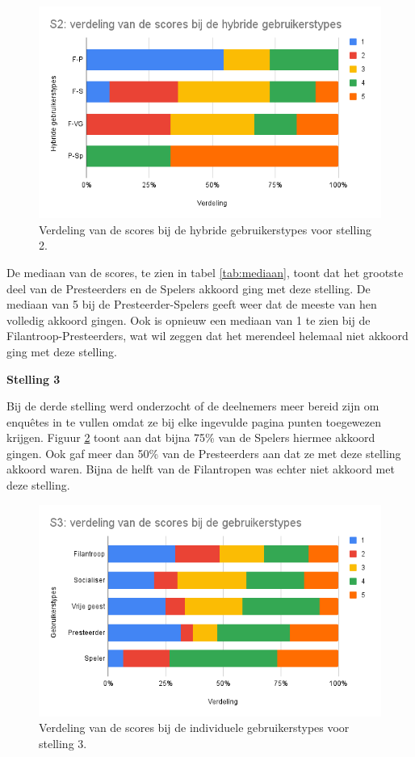 \begin{figure}
    \includegraphics[width=\linewidth]{S2_Hybride.png}
    \caption{Verdeling van de scores bij de hybride gebruikerstypes voor stelling 2.}
    \label{fig:s2_hybride}
\end{figure}

De mediaan van de scores, te zien in tabel \ref{tab:mediaan}, toont dat het grootste deel van de Presteerders en de Spelers akkoord ging met deze stelling. De mediaan van 5 bij de Presteerder-Spelers geeft weer dat de meeste van hen volledig akkoord gingen. Ook is opnieuw een mediaan van 1 te zien bij de Filantroop-Presteerders, wat wil zeggen dat het merendeel helemaal niet akkoord ging met deze stelling.

\textbf{Stelling 3}

Bij de derde stelling werd onderzocht of de deelnemers meer bereid zijn om enquêtes in te vullen omdat ze bij elke ingevulde pagina punten toegewezen krijgen. Figuur \ref{fig:s3} toont aan dat bijna 75\% van de Spelers hiermee akkoord gingen. Ook gaf meer dan 50\% van de Presteerders aan dat ze met deze stelling akkoord waren. Bijna de helft van de Filantropen was echter niet akkoord met deze stelling.

\begin{figure}
    \includegraphics[width=\linewidth]{S3.png}
    \caption{Verdeling van de scores bij de individuele gebruikerstypes voor stelling 3.}
    \label{fig:s3}
\end{figure}

